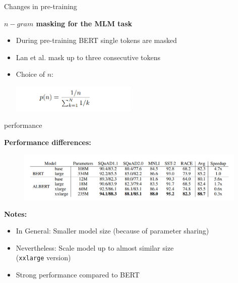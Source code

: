 
\begin{frame}{Changes in pre-training}

\vfill

	\textbf{$n-gram$ masking for the MLM task}
		
	\begin{itemize}
			\item During pre-training BERT single tokens are masked
			\item Lan et al. mask up to three consecutive tokens
			\item Choice of $n$:\\
						\begin{center}
							\includegraphics[width = 6cm]{figure/52-albert-choice-n.png}
						\end{center}
	\end{itemize}

\vfill

\end{frame}


\begin{frame}{performance}

	\textbf{Performance differences:}

	\begin{figure}
		\centering
		\includegraphics[width = 11cm]{figure/52-albert-sota.png}\\ 
	\end{figure}

	\textbf{Notes:}

	\begin{itemize}
		\item In General: Smaller model size (because of parameter sharing)
		\item Nevertheless: Scale model up to almost similar size\\(\texttt{xxlarge} version)
		\item Strong performance compared to BERT
	\end{itemize}
\end{frame}


\endlecture

